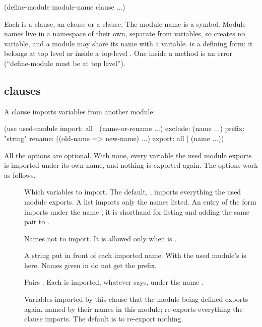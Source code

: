 \begin{dylan}
(define-module module-name clause ...)
\end{dylan}

\noindent
Each  is a  clause, an  clause or a
 clause. The module name is a symbol. Module names live in a
namespace of their own, separate from variables, so 
creates no variable, and a module may share its name with a variable.
 is a defining form: it belongs at top level or
inside a top-level . One inside a method is an error
(``define-module must be at top level'').

\subsection{ clauses}\label{sec:modules-use}

A  clause imports variables from another module:

\begin{dylan}
(use used-module
     import:  all | (name-or-rename ...)
     exclude: (name ...)
     prefix:  "string"
     rename:  ((old-name => new-name) ...)
     export:  all | (name ...))
\end{dylan}

\noindent
All the options are optional. With none, every variable the used module
exports is imported under its own name, and nothing is exported again.
The options work as follows.

\begin{description}
\item[] Which variables to
  import. The default, , imports everything the used module
  exports. A list imports only the names listed. An entry of the form
   imports  under the name ; it
  is shorthand for listing  and adding the same pair to
  .
\item[] Names not to
  import. It is allowed only when  is .
\item[] A string put in
  front of each imported name. With  the used
  module's  is  here. Names given in
   do not get the prefix.
\item[] Pairs
  . Each  is imported, whatever
   says, under the name .
\item[] Variables imported
  by this clause that the module being defined exports again, named by
  their names in this module;  re-exports everything the
  clause imports. The default is to re-export nothing.
\end{description}

